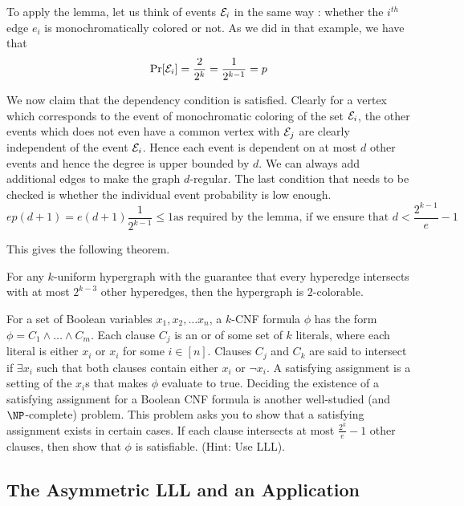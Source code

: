 To apply the lemma, let us think of events ${\cal E}_i$ in the same way : whether the $i^{th}$ edge $e_i$ is monochromatically colored or not. As we did in that example, we have that 
$$\Pr[{\cal E}_i] = \frac{2}{2^k} = \frac{1}{2^{k-1}} = p$$

We now claim that the dependency condition is satisfied. Clearly for a vertex which corresponds to the event of monochromatic coloring of the set ${\cal E}_i$, the other events which does not even have a common vertex with ${\cal E}_j$ are clearly independent of the event ${\cal E}_i$. Hence each event is dependent on at most $d$ other events and hence the degree is upper bounded by $d$. We can always add additional edges to make the graph $d$-regular. The last condition that needs to be checked is whether the individual event probability is low enough.
$$ep(d+1) = e(d+1)\frac{1}{2^{k-1}} \le 1 \textrm{as required by the lemma, if we ensure that $d < \frac{2^{k-1}}{e}-1$}$$

This gives the following theorem.

\begin{theorem}
For any $k$-uniform hypergraph with the guarantee that every hyperedge intersects with at most $2^{k-3}$ other hyperedges, then the hypergraph is $2$-colorable.
\end{theorem}
\begin{exercise}
For a set of Boolean variables $x_1, x_2, \ldots x_n$, a $k$-CNF formula $\phi$ has the form $\phi = C_1 \land \ldots \land C_m$. Each clause $C_j$ is an or of some set of $k$ literals, where each literal is either $x_i$ or $x_i$ for some $i \in [n]$. Clauses $C_j$ and $C_k$ are said to intersect if $\exists x_i$ such that both clauses contain either $x_i$ or $\lnot x_i$. A satisfying assignment is a setting of the $x_i$s that makes $\phi$ evaluate to true. Deciding the existence of a satisfying assignment for a Boolean CNF formula is another well-studied (and $\NP$-complete) problem. This problem asks you to show that a satisfying assignment exists in certain cases. If each clause intersects at most $\frac{2^k}{e}-1$ other clauses, then show that $\phi$ is satisfiable. (Hint: Use LLL).
\end{exercise}

\subsection{The Asymmetric LLL and an Application}


